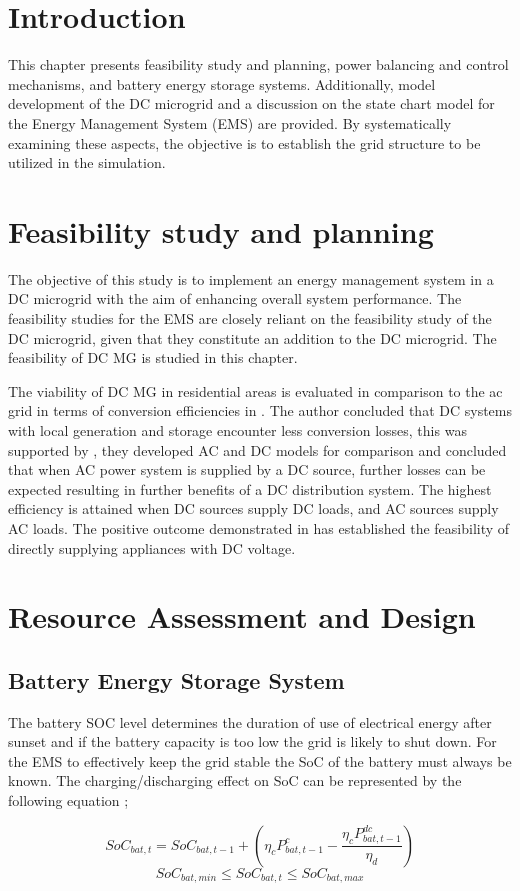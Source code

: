 \section{Introduction}
This chapter presents feasibility study and planning, power balancing and control mechanisms, and battery energy storage systems. Additionally, model development of the DC microgrid and a discussion on the state chart model for the Energy Management System (EMS) are provided. By systematically examining these aspects, the objective is to establish the grid structure to be utilized in the simulation.\par
\section{Feasibility study and planning}
The objective of this study is to implement an energy management system in a DC microgrid with the aim of enhancing overall system performance. The feasibility studies for the EMS are closely reliant on the feasibility study of the DC microgrid, given that they constitute an addition to the DC microgrid. The feasibility of DC MG is studied in this chapter. \par
The viability of DC MG in residential areas is evaluated in comparison to the ac grid in terms of conversion efficiencies in \cite{33}. The author concluded that DC systems with local generation and storage encounter less conversion losses, this was supported by \cite{34}, they developed AC and DC models for comparison  and concluded that when AC power system is supplied by a DC source, further losses can be expected resulting in further benefits of a DC distribution system. The highest efficiency is attained when DC sources supply DC loads, and AC sources supply AC loads. The positive outcome demonstrated in \cite{35} has established the feasibility of directly supplying appliances with DC voltage.\par
\section{Resource Assessment and Design}
\subsection{Battery Energy Storage System}
The battery SOC level determines the duration of use of electrical energy after sunset \cite{36} and if the battery capacity is too low the grid is likely to shut down. For the EMS to effectively keep the grid stable the SoC of the battery must always be known. The charging/discharging effect on SoC can be represented by the following equation \cite{37};\par
\begin{equation}
	{SoC_{bat,t}}={SoC_{bat,t-1}} + (\eta_cP^c_{bat,t-1}-\frac{\eta_cP^{dc}_{bat,t-1}}{{\eta_d}})    
\end{equation}
\begin{equation}
	{SoC_{bat,min}}\le{SoC_{bat,t}}\le{SoC_{bat,max}}
\end{equation}

